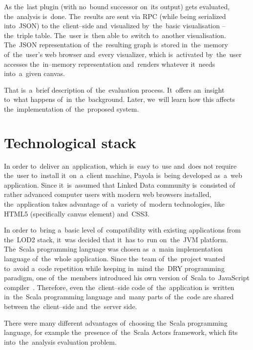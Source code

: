 As the~last plugin (with no~bound successor on~its output) gets evaluated, the~analysis is~done. The~results are sent via RPC (while being serialized into~JSON) 
to the~client--side and~visualized by~the~basic visualisation -- the~triple 
table. The~user is~then able to~switch to~another visualisation. The~JSON 
representation of~the~resulting graph is~stored in~the~memory of~the~user's web 
browser and~every visualizer, which is~activated by~the~user accesses the~in--memory representation and~renders whatever it~needs into~a~given canvas.

That is~a~brief description of~the~evaluation process. It~offers an~insight
to~what happens of~in~the~background. Later, we~will learn how this affects 
the~implementation of~the~proposed system.

\section{Technological stack}
In order to~deliver an~application, which is~easy to~use and~does not require 
the~user to~install it~on~a~client machine, Payola is~being developed as~a~web
application. Since it~is~assumed that Linked Data community is~consisted of
rather advanced computer users with modern web browsers installed, the~application 
takes advantage of~a~variety of~modern technologies, like HTML5 (specifically
canvas element) and~CSS3.

In order to~bring a~basic level of~compatibility with existing applications from 
the~LOD2 stack, it~was decided that it~has to~run on~the~JVM platform.
The~Scala programming language was chosen as~a~main implementation language of~the~whole application.
Since the~team of~the~project wanted to~avoid a~code repetition 
while keeping in~mind the~DRY programming paradigm, one of~the~members 
introduced his own version of~Scala to~JavaScript compiler~\cite{s2js}. Therefore, even the~client--side code of~the~application is~written in~the~Scala programming language 
and~many parts of~the~code are shared between the~client--side and~the~server 
side.

There were many different advantages of~choosing the~Scala programming language, 
for example the~presence of~the~Scala Actors framework, which fits into~the~analysis evaluation problem.

